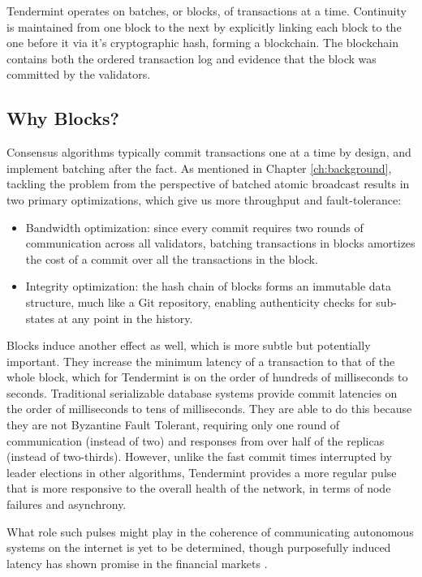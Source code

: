 Tendermint operates on batches, or blocks, of transactions at a time.
Continuity is maintained from one block to the next by explicitly linking each block to the one before it 
via it's cryptographic hash, forming a blockchain. 
The blockchain contains both the ordered transaction log and evidence that the block was committed 
by the validators.

\subsection{Why Blocks?}
Consensus algorithms typically commit transactions one at a time by design, 
and implement batching after the fact.
As mentioned in Chapter \ref{ch:background}, 
tackling the problem from the perspective of batched atomic broadcast
results in two primary optimizations, which give us more throughput and fault-tolerance:

\begin{itemize}
\item{Bandwidth optimization: since every commit requires two rounds of communication across all validators, 
	batching transactions in blocks amortizes the cost of a commit over all the transactions in the block.}
\item{Integrity optimization: the hash chain of blocks forms an immutable data structure, much like a Git repository, enabling authenticity checks for sub-states at any point in the history.}
\end{itemize}

Blocks induce another effect as well, which is more subtle but potentially important. 
They increase the minimum latency of a transaction to that of the whole block, 
which for Tendermint is on the order of hundreds of milliseconds to seconds.
Traditional serializable database systems provide commit latencies on the 
order of milliseconds to tens of milliseconds.
They are able to do this because they are not Byzantine Fault Tolerant, 
requiring only one round of communication (instead of two)
and responses from over half of the replicas (instead of two-thirds).
However, unlike the fast commit times interrupted by leader elections in other algorithms,
Tendermint provides a more regular pulse that is more responsive to the overall health of the network, 
in terms of node failures and asynchrony.

What role such pulses might play in the coherence of 
communicating autonomous systems on the internet is yet to be determined,
though purposefully induced latency has shown promise in the financial markets \cite{ryan2015beyond}.

